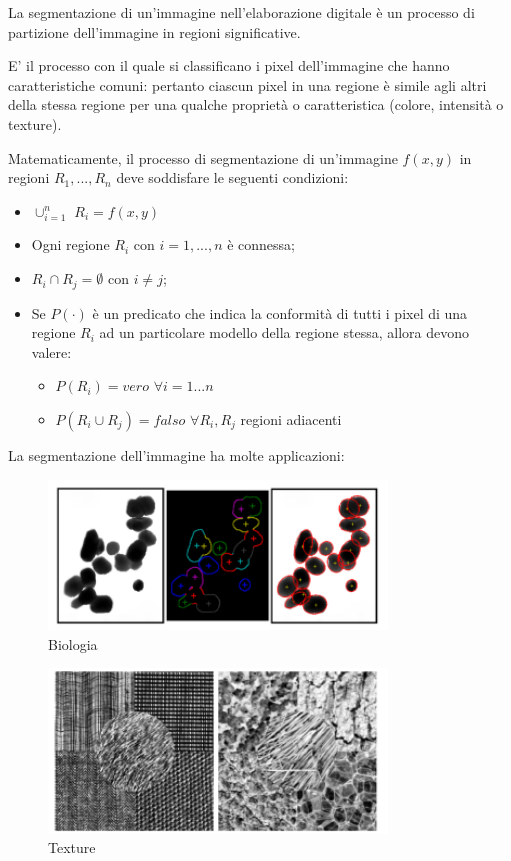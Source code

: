 La segmentazione di un'immagine nell'elaborazione digitale è un processo di
partizione dell'immagine in regioni significative.

\begin{definition}
    E' il processo con il quale si classificano i pixel dell'immagine che hanno
    caratteristiche comuni: pertanto ciascun pixel in una regione è simile agli
    altri della stessa regione per una qualche proprietà o caratteristica
    (colore, intensità o texture).
\end{definition}

Matematicamente, il processo di segmentazione di un'immagine $f(x,y)$ in regioni
$R_1,...,R_n$ deve soddisfare le seguenti condizioni:

\begin{itemize}
    \item $\cup^n_{i=1}$ $R_i = f(x,y)$
    \item Ogni regione $R_i$ con $i=1,...,n$ è connessa;
    \item $R_i \cap R_j = \emptyset$ con $i \neq j$;
    \item Se $P(\cdot)$ è un predicato che indica la conformità di tutti i pixel
          di una regione $R_i$ ad un particolare modello della regione stessa,
          allora devono valere:
          \begin{itemize}
              \item $P(R_i) = vero$ $\forall i = 1...n$
              \item $P(R_i \cup R_j) = falso$ $\forall R_i, R_j$ regioni
                    adiacenti
          \end{itemize}
\end{itemize}

La segmentazione dell'immagine ha molte applicazioni:
\begin{figure}[H]
    \centering
    \includegraphics[width=9cm, keepaspectratio]{capitoli/immagini/imgs/biologia.png}
    \caption{Biologia}
\end{figure}

\begin{figure}[H]
    \centering
    \includegraphics[width=9cm, keepaspectratio]{capitoli/immagini/imgs/texture.png}
    \caption{Texture}
\end{figure}

